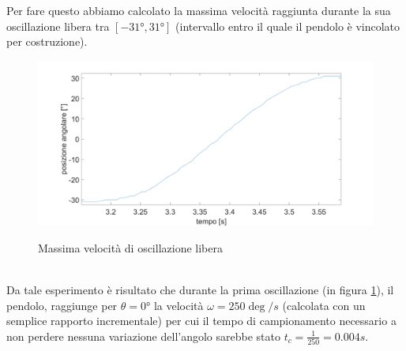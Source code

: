 Per fare questo abbiamo calcolato la massima velocità raggiunta durante la sua oscillazione libera tra $[\ang{-31},\ang{+31}]$ (intervallo entro il quale il pendolo è vincolato per costruzione).
\begin{figure}[ht]
	\centering
	\includegraphics[width=\textwidth]{SlewRate.PNG}\\
	\caption{Massima velocità di oscillazione libera}
	\label{slewRate}
\end{figure}
\\Da tale esperimento è risultato che durante la prima oscillazione (in figura \ref{slewRate}), il pendolo, raggiunge per $\theta=\ang{0}$ la velocità $\omega=250\deg/s$ (calcolata con un semplice rapporto incrementale) per cui il tempo di campionamento necessario a non perdere nessuna variazione dell'angolo sarebbe stato $t_c=\displaystyle\frac{1}{250}=0.004s$.\\

